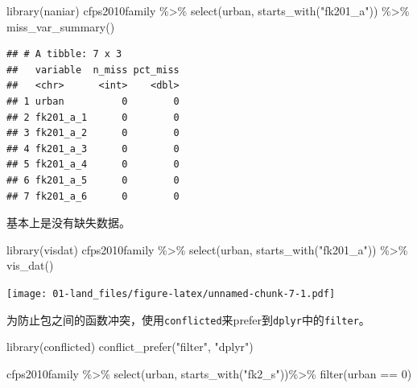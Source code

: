 \documentclass[
  oneside]{book}
\newenvironment{Shaded}{\begin{snugshade}}{\end{snugshade}}
\newcommand{\DecValTok}[1]{\textcolor[rgb]{0.00,0.00,0.81}{#1}}
\newcommand{\FunctionTok}[1]{\textcolor[rgb]{0.00,0.00,0.00}{#1}}
\newcommand{\NormalTok}[1]{#1}
\newcommand{\SpecialCharTok}[1]{\textcolor[rgb]{0.00,0.00,0.00}{#1}}
\newcommand{\StringTok}[1]{\textcolor[rgb]{0.31,0.60,0.02}{#1}}
\begin{document}
\begin{Shaded}
\begin{Highlighting}[]
\FunctionTok{library}\NormalTok{(naniar)}
\NormalTok{cfps2010family }\SpecialCharTok{\%\textgreater{}\%}
  \FunctionTok{select}\NormalTok{(urban, }\FunctionTok{starts\_with}\NormalTok{(}\StringTok{"fk201\_a"}\NormalTok{)) }\SpecialCharTok{\%\textgreater{}\%}
  \FunctionTok{miss\_var\_summary}\NormalTok{()}
\end{Highlighting}
\end{Shaded}

\begin{verbatim}
## # A tibble: 7 x 3
##   variable  n_miss pct_miss
##   <chr>      <int>    <dbl>
## 1 urban          0        0
## 2 fk201_a_1      0        0
## 3 fk201_a_2      0        0
## 4 fk201_a_3      0        0
## 5 fk201_a_4      0        0
## 6 fk201_a_5      0        0
## 7 fk201_a_6      0        0
\end{verbatim}

基本上是没有缺失数据。

\begin{Shaded}
\begin{Highlighting}[]
\FunctionTok{library}\NormalTok{(visdat)}
\NormalTok{cfps2010family }\SpecialCharTok{\%\textgreater{}\%}
  \FunctionTok{select}\NormalTok{(urban, }\FunctionTok{starts\_with}\NormalTok{(}\StringTok{"fk201\_a"}\NormalTok{)) }\SpecialCharTok{\%\textgreater{}\%}
  \FunctionTok{vis\_dat}\NormalTok{()}
\end{Highlighting}
\end{Shaded}

\texttt{[image: 01-land\_files/figure-latex/unnamed-chunk-7-1.pdf]}

为防止包之间的函数冲突，使用\texttt{conflicted}来prefer到\texttt{dplyr}中的\texttt{filter}。

\begin{Shaded}
\begin{Highlighting}[]
\FunctionTok{library}\NormalTok{(conflicted)}
\FunctionTok{conflict\_prefer}\NormalTok{(}\StringTok{"filter"}\NormalTok{, }\StringTok{"dplyr"}\NormalTok{)}

\NormalTok{cfps2010family }\SpecialCharTok{\%\textgreater{}\%}
  \FunctionTok{select}\NormalTok{(urban, }\FunctionTok{starts\_with}\NormalTok{(}\StringTok{"fk2\_s"}\NormalTok{))}\SpecialCharTok{\%\textgreater{}\%}
  \FunctionTok{filter}\NormalTok{(urban }\SpecialCharTok{==} \DecValTok{0}\NormalTok{)}
\end{Highlighting}
\end{Shaded}
\end{document}
